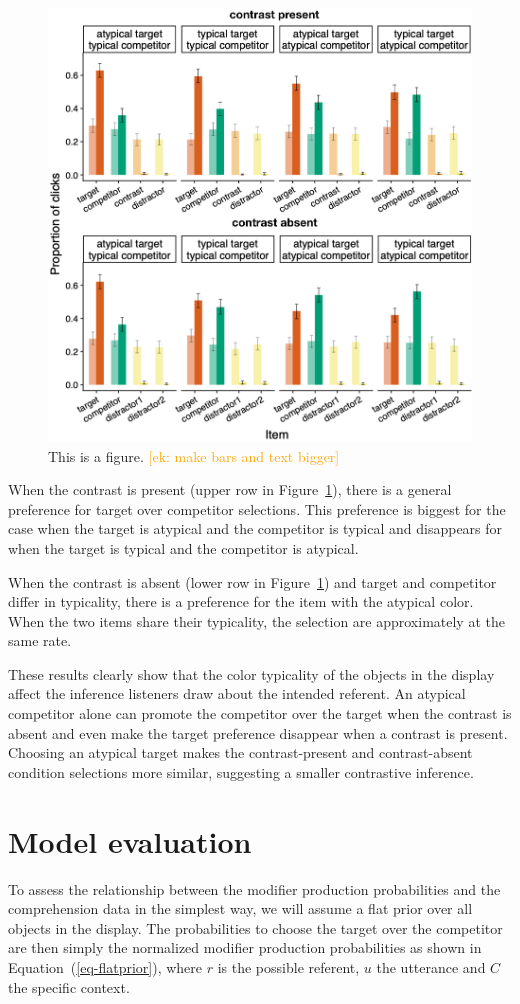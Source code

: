 \documentclass[10pt,letterpaper]{article}
\newcommand{\ek}[1]{\textcolor{Orange}{[ek: #1]}}
\begin{document}
\begin{figure}
	\begin{center}
		\includegraphics[width=.475\textwidth]{graphs/compr-bycond-paper.pdf}
	\end{center}
\caption{This is a figure. \ek{make bars and text bigger}} 
\label{compr-results}
\end{figure}

When the contrast is present (upper row in Figure~\ref{compr-results}), there is a general preference for target over competitor selections. This preference is biggest for the case when the target is atypical and the competitor is typical and disappears for when the target is typical and the competitor is atypical. 

When the contrast is absent (lower row in Figure~\ref{compr-results}) and target and competitor differ in typicality, there is a preference for the item with the atypical color. When the two items share their typicality, the selection are approximately at the same rate. 

These results clearly show that the color typicality of the objects in the display affect the inference listeners draw about the intended referent. An atypical competitor alone can promote the competitor over the target when the contrast is absent and even make the target preference disappear when a contrast is present. Choosing an atypical target makes the contrast-present and contrast-absent condition selections more similar, suggesting a smaller contrastive inference. 

\section{Model evaluation}

To assess the relationship between the modifier production probabilities and the comprehension data in the simplest way, we will assume a flat prior over all objects in the display. The probabilities to choose the target over the competitor are then simply the normalized modifier production probabilities as shown in Equation~(\ref{eq-flatprior}), where $r$ is the possible referent, $u$ the utterance and $C$ the specific context.
\end{document}
